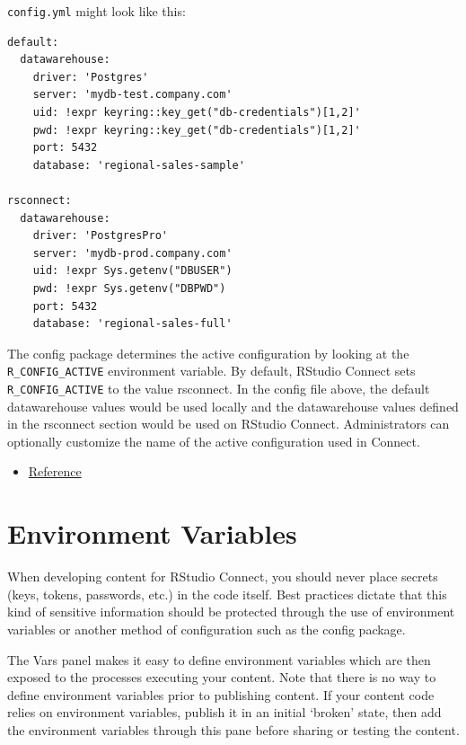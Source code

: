 \documentclass[]{book}
\providecommand{\tightlist}{%
  \setlength{\itemsep}{0pt}\setlength{\parskip}{0pt}}
\theoremstyle{definition}
\theoremstyle{definition}
\theoremstyle{definition}
\theoremstyle{remark}
\begin{document}
\texttt{config.yml} might look like this:

\begin{verbatim}
default:
  datawarehouse:
    driver: 'Postgres' 
    server: 'mydb-test.company.com'
    uid: !expr keyring::key_get("db-credentials")[1,2]'
    pwd: !expr keyring::key_get("db-credentials")[1,2]'
    port: 5432
    database: 'regional-sales-sample'
    
rsconnect:
  datawarehouse:
    driver: 'PostgresPro'
    server: 'mydb-prod.company.com'
    uid: !expr Sys.getenv("DBUSER")
    pwd: !expr Sys.getenv("DBPWD")
    port: 5432
    database: 'regional-sales-full'
\end{verbatim}

The config package determines the active configuration by looking at the
\texttt{R\_CONFIG\_ACTIVE} environment variable. By default, RStudio
Connect sets \texttt{R\_CONFIG\_ACTIVE} to the value rsconnect. In the
config file above, the default datawarehouse values would be used
locally and the datawarehouse values defined in the rsconnect section
would be used on RStudio Connect. Administrators can optionally
customize the name of the active configuration used in Connect.

\begin{itemize}
\tightlist
\item
  \href{https://db.rstudio.com/best-practices/portable-code/\#deploying-with-the-config-package}{Reference}
\end{itemize}

\hypertarget{environment-variables}{%
\section{Environment Variables}\label{environment-variables}}

When developing content for RStudio Connect, you should never place
secrets (keys, tokens, passwords, etc.) in the code itself. Best
practices dictate that this kind of sensitive information should be
protected through the use of environment variables or another method of
configuration such as the config package.

The Vars panel makes it easy to define environment variables which are
then exposed to the processes executing your content. Note that there is
no way to define environment variables prior to publishing content. If
your content code relies on environment variables, publish it in an
initial `broken' state, then add the environment variables through this
pane before sharing or testing the content.
\end{document}
